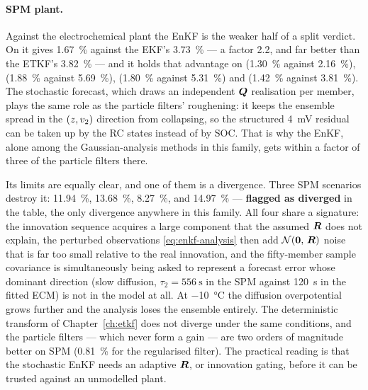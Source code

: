 \paragraph{SPM plant.}  Against the electrochemical plant the EnKF is the weaker half of a split
verdict.  On  it gives \SI{1.67}{\percent} against the EKF's \SI{3.73}{\percent} --- a
factor \num{2.2}, and far better than the ETKF's \SI{3.82}{\percent} --- and it holds that advantage
on  (\SI{1.30}{\percent} against \SI{2.16}{\percent}), 
(\SI{1.88}{\percent} against \SI{5.69}{\percent}),  (\SI{1.80}{\percent}
against \SI{5.31}{\percent}) and  (\SI{1.42}{\percent} against
\SI{3.81}{\percent}).  The stochastic forecast, which draws an independent $\bm{Q}$ realisation per
member, plays the same role as the particle filters' roughening: it keeps the ensemble spread in
the $(z,v_2)$ direction from collapsing, so the structured \SI{4}{\milli\volt} residual can be
taken up by the RC states instead of by SOC.  That is why the EnKF, alone among the
Gaussian-analysis methods in this family, gets within a factor of three of the particle filters
there.

Its limits are equally clear, and one of them is a divergence.  Three SPM scenarios destroy it:
 \SI{11.94}{\percent},  \SI{13.68}{\percent},
 \SI{8.27}{\percent}, and  \SI{14.97}{\percent} --- \textbf{flagged
as diverged} in the table, the only divergence anywhere in this family.  All four share a
signature: the innovation sequence acquires a large component that the assumed $\bm{R}$ does not
explain, the perturbed observations \eqref{eq:enkf-analysis} then add $\mathcal{N}\!\left(\bm 0,\,\bm{R}\right)$ noise that is
far too small relative to the real innovation, and the fifty-member sample covariance is
simultaneously being asked to represent a forecast error whose dominant direction (slow diffusion,
$\tau_2 = \SI{556}{\second}$ in the SPM against \SI{120}{\second} in the fitted ECM) is not in the
model at all.  At \SI{-10}{\celsius} the diffusion overpotential grows further and the analysis
loses the ensemble entirely.  The deterministic transform of Chapter~\ref{ch:etkf} does not diverge
under the same conditions, and the particle filters --- which never form a gain --- are two orders
of magnitude better on SPM  (\SI{0.81}{\percent} for the regularised filter).  The
practical reading is that the stochastic EnKF needs an adaptive $\bm{R}$, or innovation gating, before
it can be trusted against an unmodelled plant.


